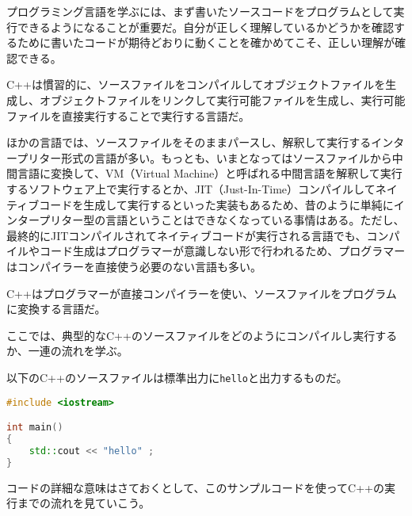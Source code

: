 
プログラミング言語を学ぶには、まず書いたソースコードをプログラムとして実行できるようになることが重要だ。自分が正しく理解しているかどうかを確認するために書いたコードが期待どおりに動くことを確かめてこそ、正しい理解が確認できる。


C++は慣習的に、ソースファイルをコンパイルしてオブジェクトファイルを生成し、オブジェクトファイルをリンクして実行可能ファイルを生成し、実行可能ファイルを直接実行することで実行する言語だ。

ほかの言語では、ソースファイルをそのままパースし、解釈して実行するインタープリター形式の言語が多い。もっとも、いまとなってはソースファイルから中間言語に変換して、VM（Virtual Machine）と呼ばれる中間言語を解釈して実行するソフトウェア上で実行するとか、JIT（Just-In-Time）コンパイルしてネイティブコードを生成して実行するといった実装もあるため、昔のように単純にインタープリター型の言語ということはできなくなっている事情はある。ただし、最終的にJITコンパイルされてネイティブコードが実行される言語でも、コンパイルやコード生成はプログラマーが意識しない形で行われるため、プログラマーはコンパイラーを直接使う必要のない言語も多い。

C++はプログラマーが直接コンパイラーを使い、ソースファイルをプログラムに変換する言語だ。


ここでは、典型的なC++のソースファイルをどのようにコンパイルし実行するか、一連の流れを学ぶ。


以下のC++のソースファイルは標準出力に\texttt{hello}と出力するものだ。

\begin{lstlisting}[language={C++}]
#include <iostream>

int main()
{
    std::cout << "hello" ;
}
\end{lstlisting}

コードの詳細な意味はさておくとして、このサンプルコードを使ってC++の実行までの流れを見ていこう。

